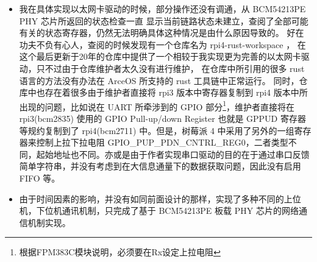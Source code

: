    \begin{itemize}
        \item 我在具体实现以太网卡驱动的时候，部分操作还没有调通，从 BCM54213PE PHY 芯片所返回的状态检查一直
        显示当前链路状态未建立，查阅了全部可能有关的状态寄存器，仍然无法明确具体这种情况是由什么原因导致的。
        好在功夫不负有心人，查阅的时候发现有一个仓库名为 rpi4-rust-workspace \cite{rpi4-rust-workspace}，
        在这个最后更新于20年的仓库中提供了一个相较于我实现更为完善的以太网卡驱动，只不过由于仓库维护者太久没有进行维护，
        在仓库中所引用的很多 rust 语言的方法没有办法在 ArceOS 所支持的 rust 工具链中正常运行。
        同时，仓库中也存在着很多由于维护者直接将 rpi3 版本中寄存器复制到 rpi4 版本中所出现的问题，比如说在
        UART 所牵涉到的 GPIO 部分\footnote{根据FPM383C模块说明，必须要在Rx设定上拉电阻}，维护者直接将在
        rpi3(bcm2835) 使用的 GPIO Pull-up/down Register 也就是 GPPUD 寄存器等规约复制到了 rpi4(bcm2711)
        中。\cite{raspberry-pi-bcm2835}但是，树莓派 4 中采用了另外的一组寄存器来控制上拉下拉电阻 
        GPIO\_PUP\_PDN\_CNTRL\_REG0，二者类型不同，起始地址也不同。亦或是由于作者实现串口驱动的目的在于通过串口反馈
        简单字符串，并没有考虑到在大信息通量下的数据获取问题，因此没有启用 FIFO 等。
        \item 由于时间因素的影响，并没有如同前面设计的那样，实现了多种不同的上位机，下位机通讯机制，只完成了基于 BCM54213PE 板载
        PHY 芯片的网络通信机制实现。
    \end{itemize}